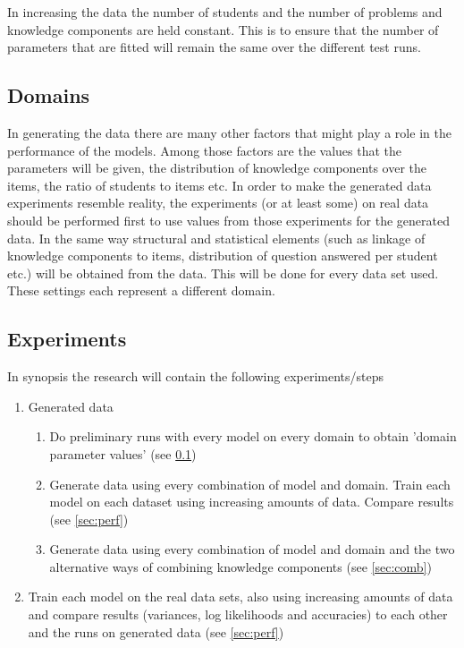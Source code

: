 \documentclass{article}
\begin{document}
In increasing the data the number of students and the number of problems and knowledge components are held constant. This is to ensure that the number of parameters that are fitted will remain the same over the different test runs.

\subsection{Domains}
\label{sec:domain}
In generating the data there are many other factors that might play a role in the performance of the models. Among those factors are the values that the parameters will be given, the distribution of knowledge components over the items, the ratio of students to items etc. In order to make the generated data experiments resemble reality, the experiments (or at least some) on real data should be performed first to use values from those experiments for the generated data. In the same way structural and statistical elements (such as linkage of knowledge components to items, distribution of question answered per student etc.) will be obtained from the data. This will be done for every data set used. These settings each represent a different domain.

\subsection{Experiments}
In synopsis the research will contain the following experiments/steps
\begin{enumerate}
\item Generated data
\begin{enumerate}
\item Do preliminary runs with every model on every domain to obtain 'domain parameter values' (see \ref{sec:domain})
\item Generate data using every combination of model and domain. Train each model on each dataset using increasing amounts of data. Compare results (see \ref{sec:perf})
\item Generate data using every combination of model and domain and the two alternative ways of combining knowledge components (see \ref{sec:comb})
\end{enumerate}
\item Train each model on the real data sets, also using increasing amounts of data and compare results (variances, log likelihoods and accuracies) to each other and the runs on generated data (see \ref{sec:perf})
\end{enumerate}
\end{document}
